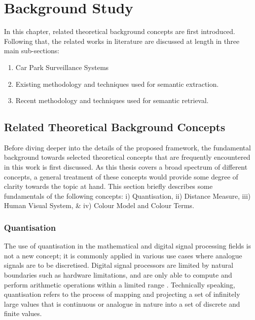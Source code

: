 


\chapter{Background Study} 
\label{section:litreview}

In this chapter, related theoretical background concepts are first introduced. 
Following that, the related works in literature are discussed at length in three main sub-sections:
\begin{enumerate}
 \item Car Park Surveillance Systems
 \item Existing methodology and techniques used for semantic extraction.
 \item Recent methodology and techniques used for semantic retrieval.
\end{enumerate}



\section{Related Theoretical Background Concepts}
\label{subsec:relatedConcepts}

Before diving deeper into the details of the proposed framework,
the fundamental background towards selected theoretical concepts that are frequently encountered in this work is first discussed. As this thesis covers a broad spectrum of
different concepts, a general treatment of these concepts would provide
some degree of clarity towards the topic at hand. This section briefly describes
some fundamentals of the following concepts: i) Quantisation, ii) Distance
Measure, iii) Human Visual System, \& iv) Colour Model and Colour Terms.


\vspace{1em}
\subsection{Quantisation}

The use of quantisation in the mathematical and digital signal processing fields
is not a new concept; it is commonly applied in various use cases where analogue signals are to be discretised. Digital
signal processors are limited by natural boundaries such as hardware
limitations, and are only able to compute and perform arithmetic operations
within a limited range \cite{spors_2018}. Technically speaking, quantisation refers to the
process of mapping and projecting a set of infinitely large values that is
continuous or analogue in nature into a set of discrete and finite values.

